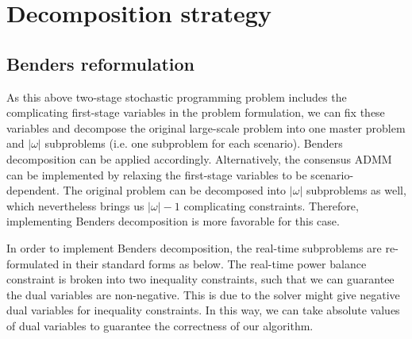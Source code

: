\section{Decomposition strategy} \label{benders}
\subsection{Benders reformulation}
As this above two-stage stochastic programming problem includes the complicating first-stage variables in the problem formulation, we can fix these variables and decompose the original large-scale problem into one master problem and $\lvert \omega \rvert$ subproblems (i.e. one subproblem for each scenario). Benders decomposition can be applied accordingly. Alternatively, the consensus ADMM can be implemented by relaxing the first-stage variables to be scenario-dependent. The original problem can be decomposed into $\lvert \omega \rvert$ subproblems as well, which nevertheless brings us $\lvert \omega \rvert-1$ complicating constraints. Therefore, implementing Benders decomposition is more favorable for this case.

In order to implement Benders decomposition, the real-time subproblems are re-formulated in their standard forms as below. The real-time power balance constraint is broken into two inequality constraints, such that we can guarantee the dual variables are non-negative.
This is due to the solver might give negative dual variables for inequality constraints. In this way, we can take absolute values of dual variables to guarantee the correctness of our algorithm.


